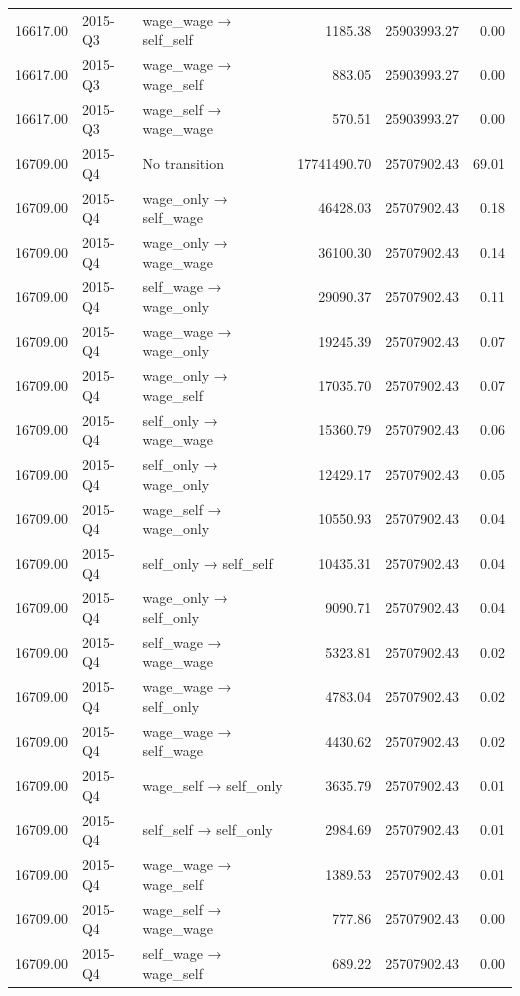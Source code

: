 \begin{table}[ht]
{\begin{tabular}{rllrrr}
  16617.00 & 2015-Q3 & wage\_wage → self\_self & 1185.38 & 25903993.27 & 0.00 \\ 
  16617.00 & 2015-Q3 & wage\_wage → wage\_self & 883.05 & 25903993.27 & 0.00 \\ 
  16617.00 & 2015-Q3 & wage\_self → wage\_wage & 570.51 & 25903993.27 & 0.00 \\ 
  16709.00 & 2015-Q4 & No transition & 17741490.70 & 25707902.43 & 69.01 \\ 
  16709.00 & 2015-Q4 & wage\_only → self\_wage & 46428.03 & 25707902.43 & 0.18 \\ 
  16709.00 & 2015-Q4 & wage\_only → wage\_wage & 36100.30 & 25707902.43 & 0.14 \\ 
  16709.00 & 2015-Q4 & self\_wage → wage\_only & 29090.37 & 25707902.43 & 0.11 \\ 
  16709.00 & 2015-Q4 & wage\_wage → wage\_only & 19245.39 & 25707902.43 & 0.07 \\ 
  16709.00 & 2015-Q4 & wage\_only → wage\_self & 17035.70 & 25707902.43 & 0.07 \\ 
  16709.00 & 2015-Q4 & self\_only → wage\_wage & 15360.79 & 25707902.43 & 0.06 \\ 
  16709.00 & 2015-Q4 & self\_only → wage\_only & 12429.17 & 25707902.43 & 0.05 \\ 
  16709.00 & 2015-Q4 & wage\_self → wage\_only & 10550.93 & 25707902.43 & 0.04 \\ 
  16709.00 & 2015-Q4 & self\_only → self\_self & 10435.31 & 25707902.43 & 0.04 \\ 
  16709.00 & 2015-Q4 & wage\_only → self\_only & 9090.71 & 25707902.43 & 0.04 \\ 
  16709.00 & 2015-Q4 & self\_wage → wage\_wage & 5323.81 & 25707902.43 & 0.02 \\ 
  16709.00 & 2015-Q4 & wage\_wage → self\_only & 4783.04 & 25707902.43 & 0.02 \\ 
  16709.00 & 2015-Q4 & wage\_wage → self\_wage & 4430.62 & 25707902.43 & 0.02 \\ 
  16709.00 & 2015-Q4 & wage\_self → self\_only & 3635.79 & 25707902.43 & 0.01 \\ 
  16709.00 & 2015-Q4 & self\_self → self\_only & 2984.69 & 25707902.43 & 0.01 \\ 
  16709.00 & 2015-Q4 & wage\_wage → wage\_self & 1389.53 & 25707902.43 & 0.01 \\ 
  16709.00 & 2015-Q4 & wage\_self → wage\_wage & 777.86 & 25707902.43 & 0.00 \\ 
  16709.00 & 2015-Q4 & self\_wage → wage\_self & 689.22 & 25707902.43 & 0.00 \\ 

\end{tabular}}
\end{table}
